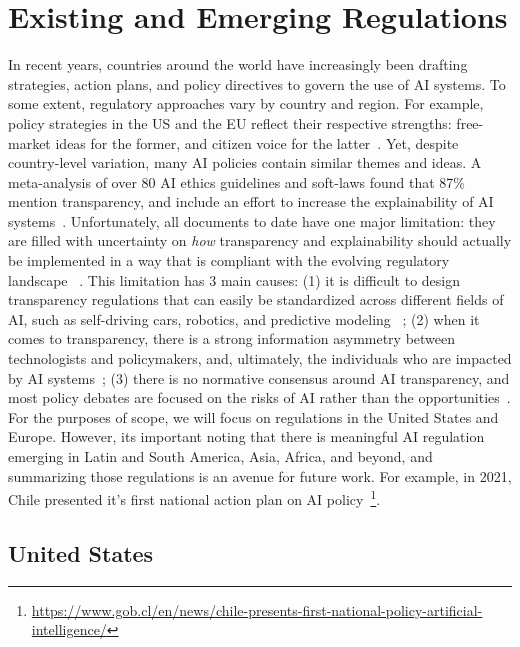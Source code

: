 \section{Existing and Emerging Regulations}
\label{sec:laws}

In recent years, countries around the world have increasingly been drafting strategies, action plans, and policy directives to govern the use of AI systems. To some extent, regulatory approaches vary by country and region. For example, policy strategies in the US and the EU reflect their respective strengths: free-market ideas for the former, and citizen voice for the latter~\cite{gill2020policy}. Yet, despite country-level variation, many AI policies contain similar themes and ideas. A meta-analysis of over 80 AI ethics guidelines and soft-laws found that 87\% mention transparency, and include an effort to increase the explainability of AI systems~\cite{DBLP:journals/corr/abs-1906-11668}. Unfortunately, all documents to date have one major limitation: they are filled with uncertainty on \textit{how} transparency and explainability should actually be implemented in a way that is compliant with the evolving regulatory landscape ~\cite{DBLP:journals/corr/abs-1906-11668, DBLP:journals/corr/abs-1906-11668, DBLP:journals/internet/GasserA17, loi2021towards}. This limitation has 3 main causes: (1) it is difficult to design transparency regulations that can easily be standardized across different fields of AI, such as self-driving cars, robotics, and predictive modeling ~\cite{wachter2017transparent}; (2) when it comes to transparency, there is a strong information asymmetry between technologists and policymakers, and, ultimately, the individuals who are impacted by AI systems~\cite{KUZIEMSKI2020101976}; (3) there is no normative consensus around AI transparency, and most policy debates are focused on the risks of AI rather than the opportunities~\cite{DBLP:journals/internet/GasserA17}. For the purposes of scope, we will focus on regulations in the United States and Europe. However, its important noting that there is meaningful AI regulation emerging in Latin and South America, Asia, Africa, and beyond, and summarizing those regulations is an avenue for future work. For example, in 2021, Chile presented it's first national action plan on AI policy~\footnote{\url{https://www.gob.cl/en/news/chile-presents-first-national-policy-artificial-intelligence/}}.

\subsection{United States}


